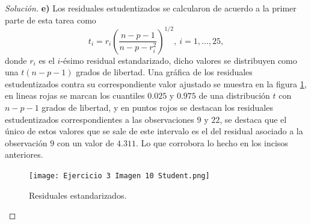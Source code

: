 \documentclass[10.5pt,notitlepage]{article}
\newenvironment{solucion}
  {\begin{proof}[Solución]}
  {\end{proof}}
\newcommand{\pare}[1]{\left( #1 \right)}
\theoremstyle{plain}
\begin{document}
\begin{solucion}
\noindent \textbf{e)} Los residuales estudentizados se calcularon de acuerdo a la primer parte de esta tarea como
\begin{equation*}
    t_i = r_{i}\pare{\frac{n - p - 1}{n - p -r_{i}^2}}^{1/2}, \ i = 1,\hdots,25,
\end{equation*}
donde \(r_i\) es el \(i\)-ésimo residual estandarizado, dicho valores se distribuyen como una \(t(n- p -1)\) grados de libertad. Una gráfica de los residuales estudentizados contra su correspondiente valor ajustado se muestra en la figura  \ref{fig:17ups}, en lineas rojas se marcan los cuantiles \(0.025\) y \(0.975\) de una distribución \(t\) con \(n-p-1\) grados de libertad, y en puntos rojos se destacan los residuales estudentizados correspondientes a las observaciones \(9\) y \(22\), se destaca que el único de estos valores que se sale de este intervalo es el del residual asociado a la observación \(9\) con un valor de \(4.311\). Lo que corrobora lo hecho en los incisos anteriores.     
\begin{figure}[htb]
 \centering
 \texttt{[image: Ejercicio 3 Imagen 10 Student.png]}
 \caption{Residuales estandarizados.}
\label{fig:17ups}
\end{figure}

\end{solucion}
\end{document}
